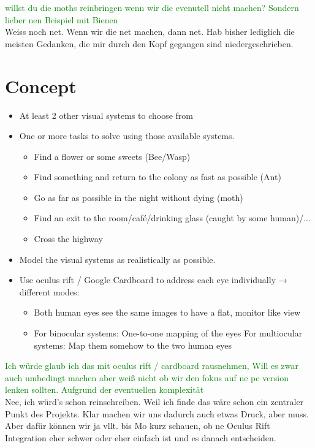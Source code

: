 \documentclass{acm_proc_article-sp}
\newcommand{\sebastian}[1]{\textcolor{Green}{#1}}
\newcommand{\stefan}[1]{\textcolor{BurntOrange}{#1}}
\begin{document}
\sebastian{willst du die moths reinbringen wenn wir die evenutell nicht machen?
Sondern lieber nen Beispiel mit Bienen}\\
\stefan{Weiss noch net. Wenn wir die net machen, dann net. Hab bisher lediglich
die meisten Gedanken, die mir durch den Kopf gegangen sind niedergeschrieben.}



\section{Concept}
\begin{itemize}
\item At least 2 other visual systems to choose from
\item One or more tasks to solve using those available systems.
  \begin{itemize}
    \item Find a flower or some sweets (Bee/Wasp)
    \item Find something and return to the colony as fast as possible (Ant)
    \item Go as far as possible in the night without dying (moth)
    \item Find an exit to the room/café/drinking glass (caught by some human)/...
    \item Cross the highway
  \end{itemize}
\item Model the visual systems as realistically as possible.
\item Use oculus rift / Google Cardboard to address each eye individually
→ different modes:
  \begin{itemize}
  \item Both human eyes see the same images to have a flat, monitor like view
  \item For binocular systems: One-to-one mapping of the eyes
        For multiocular systems: Map them somehow to the two human eyes
  \end{itemize}
\end{itemize}

\sebastian{Ich würde glaub ich das mit oculus rift / cardboard rausnehmen,
Will es zwar auch umbedingt machen aber weiß nicht ob wir den fokus auf ne pc
version lenken sollten. Aufgrund der eventuellen komplexität}\\
\stefan{Nee, ich würd's schon reinschreiben. Weil ich finde das wäre schon ein
zentraler Punkt des Projekts. Klar machen wir uns dadurch auch etwas Druck,
aber muss. Aber dafür können wir ja vllt. bis Mo kurz schauen, ob ne Oculus Rift
Integration eher schwer oder eher einfach ist und es danach entscheiden.}
\end{document}
